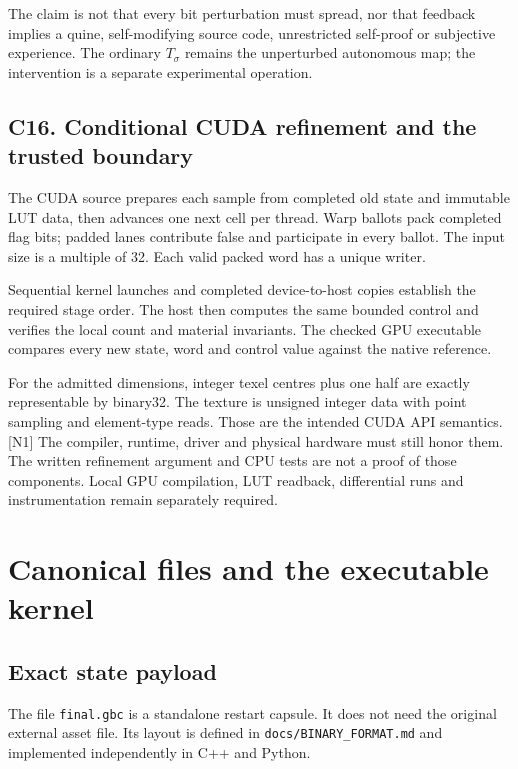 \documentclass[11pt,a4paper]{article}
\begin{document}
The claim is not that every bit perturbation must spread, nor that
feedback implies a quine, self-modifying source code, unrestricted
self-proof or subjective experience. The ordinary \(T_\sigma\) remains
the unperturbed autonomous map; the intervention is a separate
experimental operation.

\subsection{C16. Conditional CUDA refinement and the trusted
boundary}\label{c16.-conditional-cuda-refinement-and-the-trusted-boundary}

The CUDA source prepares each sample from completed old state and
immutable LUT data, then advances one next cell per thread. Warp ballots
pack completed flag bits; padded lanes contribute false and participate
in every ballot. The input size is a multiple of 32. Each valid packed
word has a unique writer.

Sequential kernel launches and completed device-to-host copies establish
the required stage order. The host then computes the same bounded
control and verifies the local count and material invariants. The
checked GPU executable compares every new state, word and control value
against the native reference.

For the admitted dimensions, integer texel centres plus one half are
exactly representable by binary32. The texture is unsigned integer data
with point sampling and element-type reads. Those are the intended CUDA
API semantics. {[}N1{]} The compiler, runtime, driver and physical
hardware must still honor them. The written refinement argument and CPU
tests are not a proof of those components. Local GPU compilation, LUT
readback, differential runs and instrumentation remain separately
required.

\section{Canonical files and the executable
kernel}\label{canonical-files-and-the-executable-kernel}

\subsection{Exact state payload}\label{exact-state-payload}

The file \texttt{final.gbc} is a standalone restart capsule. It does not
need the original external asset file. Its layout is defined in
\texttt{docs/BINARY\_FORMAT.md} and implemented independently in C++ and
Python.
\end{document}
